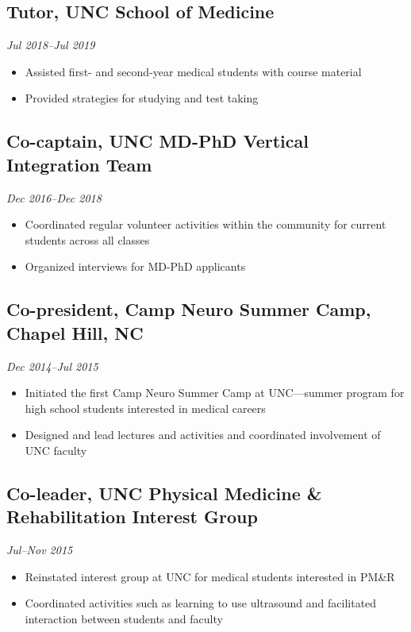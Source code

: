 \documentclass{article}
\newcommand{\dateformat}[1]{\textit{#1}}
\begin{document}
  \subsection*{Tutor, UNC School of Medicine}
    \dateformat{Jul 2018--Jul 2019}
    \begin{itemize}
      \item Assisted first- and second-year medical students with course material
      \item Provided strategies for studying and test taking
    \end{itemize}

  \subsection*{Co-captain, UNC MD-PhD Vertical Integration Team}
    \dateformat{Dec 2016--Dec 2018}
    \begin{itemize}
        \item Coordinated regular volunteer activities within the community for current students across all classes
        \item Organized interviews for MD-PhD applicants
    \end{itemize}

  \subsection*{Co-president, Camp Neuro Summer Camp, Chapel Hill, NC}
    \dateformat{Dec 2014--Jul 2015}
    \begin{itemize}
      \item Initiated the first Camp Neuro Summer Camp at UNC---summer program for high school students interested in medical careers
      \item Designed and lead lectures and activities and coordinated involvement of UNC faculty
    \end{itemize}

  \subsection*{Co-leader, UNC Physical Medicine \& Rehabilitation Interest Group}
    \dateformat{Jul--Nov 2015}
    \begin{itemize}
      \item Reinstated interest group at UNC for medical students interested in PM\&R
      \item Coordinated activities such as learning to use ultrasound and facilitated interaction between students and faculty
    \end{itemize}
\end{document}
